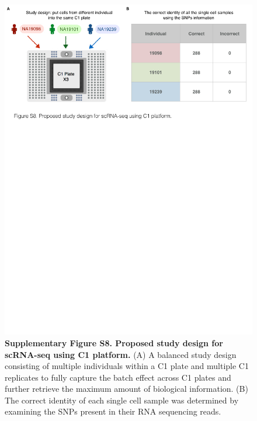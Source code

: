 \begin{figure}[htbp]
\centering
\includegraphics[width=5in]{img/ch04/Figure13.jpeg}
\caption{\textbf{Supplementary Figure S8. Proposed study design for
scRNA-seq using C1 platform.} (A) A balanced study design consisting of
multiple individuals within a C1 plate and multiple C1 replicates to
fully capture the batch effect across C1 plates and further retrieve the
maximum amount of biological information. (B) The correct identity of
each single cell sample was determined by examining the SNPs present in
their RNA sequencing reads.}
\end{figure}

